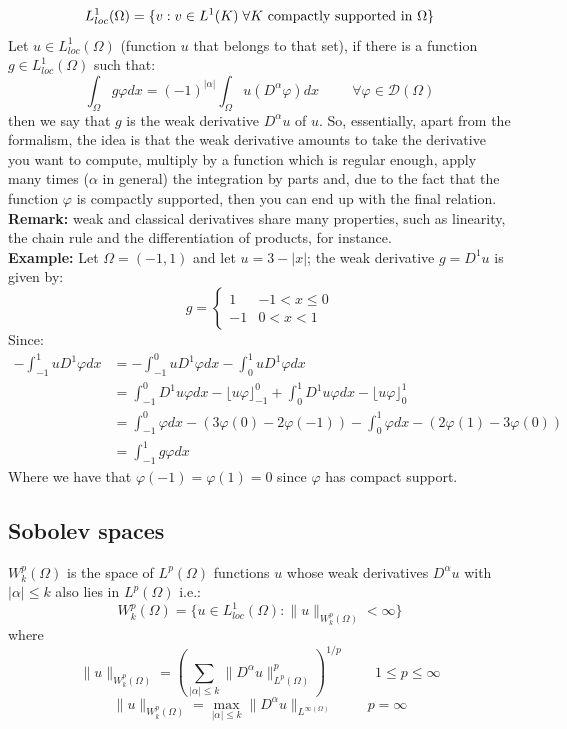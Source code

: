 \[
    L_{loc}^{1}(\Omega) = \{v:v\in L^1(K)\hspace{0.1cm} \forall K \text{ compactly supported in }\Omega \}    
\]
Let $u \in L^1_{loc}(\Omega)$ (function $u$ that belongs to that set), if there is a function $g \in L^1_{loc}(\Omega)$ such that:
\[
    \int_{\Omega} g\varphi dx = (-1)^{|\alpha|} \int_{\Omega} u(D^\alpha \varphi) dx \hspace{1cm} \forall \varphi \in \mathcal{D}(\Omega)    
\]
then we say that $g$ is the weak derivative $D^\alpha u$ of $u$.
So, essentially, apart from the formalism, the idea is that the weak derivative amounts to take the derivative you want to compute, multiply by a function which is regular enough, apply many times ($\alpha$ in general) the integration by parts and, due to the fact that the function $\varphi$ is compactly supported, then you can end up with the final relation.\\

\textbf{Remark:} weak and classical derivatives share many properties, such as linearity, the chain rule and the differentiation of products, for instance. \\

\textbf{Example:} Let $\Omega = (-1,1)$ and let $u  = 3 - |x|$; the weak derivative $g = D^1u$ is given by:
\[
    g = \begin{cases}
        1 & -1 < x \leq 0\\
        -1 & 0 < x < 1
    \end{cases}    
\]
Since:
\[
    \begin{split}
        -\int_{-1}^1 uD^1 \varphi dx &= - \int_{-1}^0 uD^1\varphi dx - \int_{0}^1 uD^1\varphi dx\\
        &= \int_{-1}^0 D^1 u \varphi dx - \lfloor u \varphi \rfloor_{-1}^0 + \int_{0}^1 D^1 u \varphi dx - \lfloor u \varphi \rfloor_{0}^1 \\
        &= \int_{-1}^0 \varphi dx - (3\varphi(0) - 2\varphi(-1)) - \int_0^1 \varphi dx - (2\varphi(1) - 3\varphi(0))\\
        &= \int_{-1}^1 g\varphi dx
    \end{split}
\]
Where we have that $\varphi(-1)=\varphi(1)=0$ since $\varphi$ has compact support. 

\subsection{Sobolev spaces}
$W_k^p(\Omega)$ is the space of $L^p(\Omega)$ functions $u$ whose weak derivatives $D^\alpha u$ with $|\alpha| \leq k$ also lies in $L^p(\Omega)$ i.e.:
\[
    W_k^p(\Omega) = \{u \in L_{loc}^1(\Omega):\|u\|_{W_k^p(\Omega)} < \infty\}
\]
where 
\[
  \|u\|_{W_k^p(\Omega)} = \left(\sum_{|\alpha| \leq k}\|D^{\alpha}u\|^p_{L^p(\Omega)} \right)^{1/p} \hspace{1cm} 1 \leq p \leq \infty
\]
\[
    \|u\|_{W_k^p(\Omega)} = \max_{|\alpha| \leq k} \|D^{\alpha}u\|_{L^{\infty(\Omega)}} \hspace{1cm} p = \infty
\]


